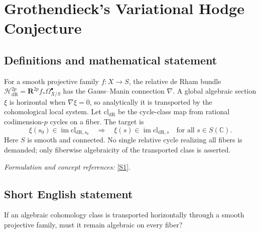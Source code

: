 \documentclass[11pt,a4paper]{article}
\newcommand{\C}{\mathbb{C}}
\newcommand{\sref}[2]{\hyperlink{source:#1:#2}{[S#2]}}
\newif\ifshowcatalogue
\newcommand{\cataloguescope}[1]{\ifshowcatalogue
 \paragraph{Exact scope in the supplied catalogue.}
 \begin{quote}\small #1\end{quote}\fi}
\numberwithin{equation}{section}
\begin{document}
\setcounter{section}{156}
\clearpage
\section{\texorpdfstring{Grothendieck's Variational Hodge Conjecture}{Grothendieck's Variational Hodge Conjecture}}\label{157}
\subsection{Definitions and mathematical statement}
For a smooth projective family $f:X\to S$, the relative de Rham bundle
$\mathcal H^{2p}_{\mathrm{dR}}=\mathbf R^{2p}f_*\Omega^\bullet_{X/S}$ has the Gauss--Manin connection $\nabla$. A global algebraic section $\xi$ is horizontal when $\nabla\xi=0$, so analytically it is transported by the cohomological local system. Let $\mathrm{cl}_{\mathrm{dR}}$ be the cycle-class map from rational codimension-$p$ cycles on a fiber. The target is
\[
 \xi(s_0)\in\operatorname{im}\mathrm{cl}_{\mathrm{dR},s_0}
 \quad\Longrightarrow\quad
 \xi(s)\in\operatorname{im}\mathrm{cl}_{\mathrm{dR},s}\quad\text{for all }s\in S(\C).
\]
Here $S$ is smooth and connected. No single relative cycle realizing all fibers is demanded; only fiberwise algebraicity of the transported class is asserted.
\par\smallskip\textit{Formulation and concept references:} \sref{157}{1}.
\cataloguescope{For every smooth projective morphism f:X->S of smooth connected complex algebraic varieties, every integer p>=0, and every global algebraic horizontal section xi of the relative algebraic de Rham cohomology bundle R\textasciicircum{}(2p)f\_*Omega\textasciicircum{}.\_(X/S) for the Gauss-Manin connection, if xi(s0) is the de Rham cycle class of a rational algebraic codimension-p cycle on one fiber X\_s0, then xi(s) is such a rational algebraic cycle class on every fiber X\_s for s in S(C).}
\subsection{Short English statement}
If an algebraic cohomology class is transported horizontally through a smooth projective family, must it remain algebraic on every fiber?
\end{document}
